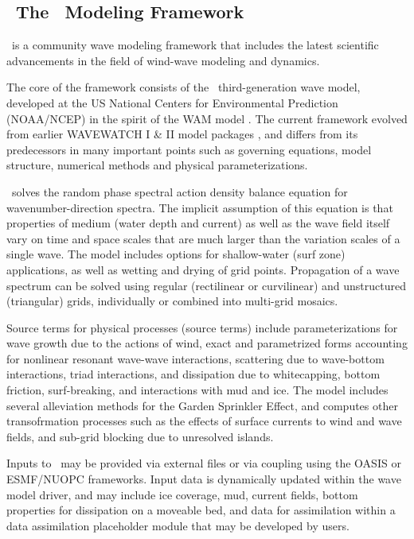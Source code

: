\vssub
\subsection{~The \ws\ Modeling Framework}
\vssub

\ww\ is a community wave modeling framework that includes the latest scientific advancements in the field of 
wind-wave modeling and dynamics.

The core of the framework consists of the \ws\ third-generation wave model, developed at the 
US National Centers for Environmental Prediction (NOAA/NCEP) in the spirit of the WAM model \citep{bk:WAM94}. 
The current framework evolved from earlier WAVEWATCH I \& II model packages \citep{tol:JPO91b, tol:JPO92}, and differs from its predecessors 
in many important points such as governing equations, model structure, numerical methods and physical parameterizations.

\ws\ solves the random phase spectral action density balance equation for wavenumber-direction spectra. The implicit 
assumption of this equation is that properties of medium (water depth and current) as well as the wave field itself 
vary on time and space scales that are much larger than the variation scales of a single wave. The model includes options 
for shallow-water (surf zone) applications, as well as wetting and drying of grid points. Propagation of a wave spectrum 
can be solved using regular (rectilinear or curvilinear) and unstructured (triangular) grids, individually or combined into
multi-grid mosaics.

Source terms for physical processes (source terms) include parameterizations for wave growth due to the actions of wind, exact and parametrized 
forms accounting for nonlinear resonant wave-wave interactions, scattering due to wave-bottom interactions, triad interactions, 
and dissipation due to whitecapping, bottom friction, surf-breaking, and interactions with mud and ice. The model includes several 
alleviation methods for the Garden Sprinkler Effect, and computes other transofrmation processes
such as the effects of surface currents to wind and wave fields, and sub-grid blocking due to unresolved islands. 

Inputs to \ws\ may be provided via external files or via coupling using the OASIS or ESMF/NUOPC frameworks. Input data is
dynamically updated within the wave model driver, and may include ice coverage, mud, current fields, bottom properties for dissipation 
on a moveable bed, and data for assimilation within a data assimilation placeholder module that may be developed by users.

